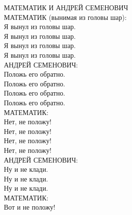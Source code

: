 МАТЕМАТИК И АНДРЕЙ СЕМЕНОВИЧ \\
    \hspace{1cm}МАТЕМАТИК (вынимая из головы шар): \\
          \hspace{2cm}Я вынул из головы шар. \\
          \hspace{2cm}Я вынул из головы шар. \\
          \hspace{2cm}Я вынул из головы шар. \\
          \hspace{2cm}Я вынул из головы шар. \\
    \hspace{1cm}АНДРЕЙ СЕМЕНОВИЧ: \\
          \hspace{2cm}Положь его обратно. \\
          \hspace{2cm}Положь его обратно. \\
          \hspace{2cm}Положь его обратно. \\
          \hspace{2cm}Положь его обратно. \\
    \hspace{1cm}МАТЕМАТИК: \\
          \hspace{2cm}Нет, не положу! \\
          \hspace{2cm}Нет, не положу! \\
          \hspace{2cm}Нет, не положу! \\
          \hspace{2cm}Нет, не положу! \\
    \hspace{1cm}АНДРЕЙ СЕМЕНОВИЧ: \\
          \hspace{2cm}Ну и не клади. \\
          \hspace{2cm}Ну и не клади. \\
          \hspace{2cm}Ну и не клади. \\
    \hspace{1cm}МАТЕМАТИК: \\
          \hspace{2cm}Вот и не положу! \\
